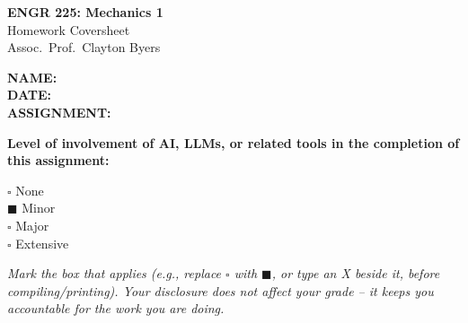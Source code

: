 \documentclass[11pt]{article}
\newcommand{\assignmentNumber}{7}
\newcommand{\assignedDate}{2 Nov 2026}
\newcommand{\dueDate}{10 Nov 2026 (11:59pm on Moodle)}
\begin{document}
\begin{titlepage}
    \centering
    \vspace*{2cm}
    {\LARGE \bfseries ENGR 225: Mechanics 1} \\[0.3cm]
    {\Large Homework Coversheet} \\[0.3cm]
    {\large Assoc.\ Prof.\ Clayton Byers} \\[2cm]

    \begin{flushleft}
        \Large
        \textbf{NAME:} \underline{} \\[1cm]
        \textbf{DATE:} \underline{\hspace{10cm}} \\[1cm]
        \textbf{ASSIGNMENT:} \underline{} \\[2cm]
    \end{flushleft}

    \large
    \textbf{Level of involvement of AI, LLMs, or related tools in the completion of this assignment:}

    \vspace{1cm}

    \begin{flushleft}
        \Large
        $\square$ \quad None \\[0.7cm]
        $\blacksquare$ \quad Minor \\[0.7cm]
        $\square$ \quad Major \\[0.7cm]
        $\square$ \quad Extensive \\[1.5cm]
    \end{flushleft}

    \normalsize
    \textit{Mark the box that applies (e.g., replace $\square$ with $\blacksquare$, or type an X beside it, before compiling/printing). Your disclosure does not affect your grade -- it keeps you accountable for the work you are doing.}

\end{titlepage}

\end{document}
